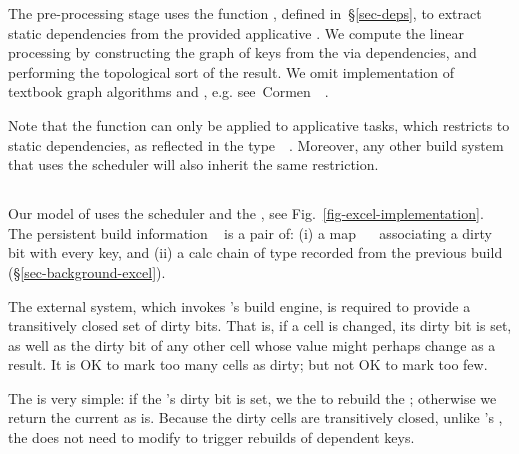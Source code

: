 The pre-processing stage uses the function , defined
in~\S\ref{sec-deps}, to extract static dependencies from the provided
applicative . We compute the linear processing  by
constructing the graph of keys  from the  via
dependencies, and performing the topological sort of the result. We omit
implementation of textbook graph algorithms  and ,
e.g. see~Cormen~\etal~.

Note that the function  can only be applied to applicative
tasks, which restricts \Make to static dependencies, as reflected in the
type~~. Moreover, any other build system that uses
the  scheduler will also inherit the same restriction.

\subsection{\Excel}\label{sec-implementation-excel}

Our model of \Excel uses the  scheduler and the
, see Fig.~\ref{fig-excel-implementation}. The persistent
build information ~ is a pair of: (i) a map
~\hs{->}~ associating a dirty bit with every key, and (ii) a
calc chain of type \hs{[@@k]} recorded from the previous build
(\S\ref{sec-background-excel}).

The external system, which invokes \Excel's build engine, is required
to provide a transitively closed set of dirty bits. That is, if a
cell is changed, its dirty bit is set, as well as the dirty bit of any other
cell whose value might perhaps change as a result. It is OK to mark too many
cells as dirty; but not OK to mark too few.

The  is very simple: if the 's dirty bit is set,
we  the  to rebuild the ; otherwise we return the
current  as is.
Because the dirty cells are transitively closed,
unlike \Make's , the  does
not need to modify  to trigger rebuilds of dependent keys.

